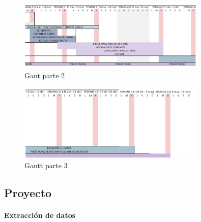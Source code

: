 \documentclass[
  letterpaper,
  DIV=11,
  numbers=noendperiod]{scrartcl}
\let\oldparagraph\paragraph
\renewcommand{\paragraph}[1]{\oldparagraph{#1}\mbox{}}
\begin{document}
\begin{figure}[htbp]
    \centering
    \includegraphics[width=0.8\textwidth, height=0.4\textheight]{gant2.png}
    \caption{Gant parte 2}
    \label{fig:gant2}
\end{figure}

\begin{figure}[htbp]
    \centering
    \includegraphics[width=0.8\textwidth, height=0.4\textheight]{gant3.png}
    \caption{Gantt parte 3}
    \label{fig:gantt3}
\end{figure}

\newpage{}

\subsection{Proyecto}\label{proyecto}

\paragraph{Extracción de datos}\label{extracciuxf3n-de-datos-1}
\end{document}
